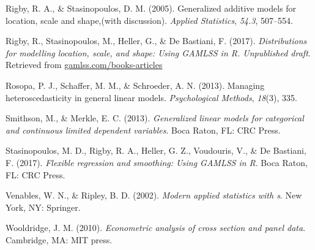 \documentclass[english,man]{apa6}
\theoremstyle{definition}
\theoremstyle{definition}
\theoremstyle{remark}
\begin{document}
\hypertarget{ref-rigby2005generalized}{}
Rigby, R. A., \& Stasinopoulos, D. M. (2005). Generalized additive
models for location, scale and shape,(with discussion). \emph{Applied
Statistics}, \emph{54.3}, 507--554.

\hypertarget{ref-rigby2017distributions}{}
Rigby, R., Stasinopoulos, M., Heller, G., \& De Bastiani, F. (2017).
\emph{Distributions for modelling location, scale, and shape: Using
GAMLSS in R. Unpublished draft}. Retrieved from
\url{gamlss.com/books-articles}

\hypertarget{ref-rosopa2013managing}{}
Rosopa, P. J., Schaffer, M. M., \& Schroeder, A. N. (2013). Managing
heteroscedasticity in general linear models. \emph{Psychological
Methods}, \emph{18}(3), 335.

\hypertarget{ref-smithson2013generalized}{}
Smithson, M., \& Merkle, E. C. (2013). \emph{Generalized linear models
for categorical and continuous limited dependent variables}. Boca Raton,
FL: CRC Press.

\hypertarget{ref-stasinopoulos2017flexible}{}
Stasinopoulos, M. D., Rigby, R. A., Heller, G. Z., Voudouris, V., \& De
Bastiani, F. (2017). \emph{Flexible regression and smoothing: Using
GAMLSS in R}. Boca Raton, FL: CRC Press.

\hypertarget{ref-venables2002modern}{}
Venables, W. N., \& Ripley, B. D. (2002). \emph{Modern applied
statistics with s}. New York, NY: Springer.

\hypertarget{ref-wooldridge2010econometric}{}
Wooldridge, J. M. (2010). \emph{Econometric analysis of cross section
and panel data}. Cambridge, MA: MIT press.
\end{document}
